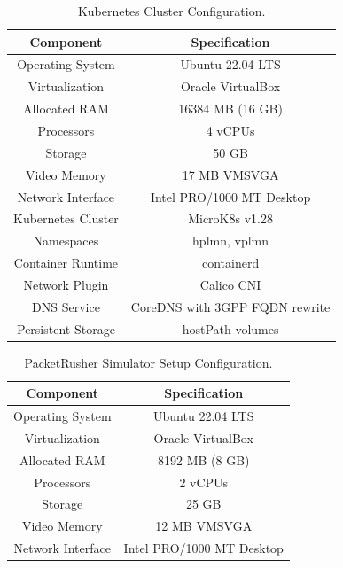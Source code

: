 \documentclass[journal,article,submit,moreauthors,pdftex]{Definitions/tsp}
\begin{document}
\begin{table}[H]
\tablesize{\footnotesize}
\caption{Kubernetes Cluster Configuration.}
\label{tab:kubernetes_config}
\begin{tabularx}{\textwidth}{CC}
\toprule
\textbf{Component}	&\textbf{Specification}	\\
\midrule
Operating System & Ubuntu 22.04 LTS \\
Virtualization & Oracle VirtualBox \\
Allocated RAM & 16384 MB (16 GB) \\
Processors & 4 vCPUs \\
Storage & 50 GB \\
Video Memory & 17 MB VMSVGA \\
Network Interface & Intel PRO/1000 MT Desktop \\
Kubernetes Cluster & MicroK8s v1.28 \\
Namespaces & hplmn, vplmn \\
Container Runtime & containerd \\
Network Plugin & Calico CNI \\
DNS Service & CoreDNS with 3GPP FQDN rewrite \\
Persistent Storage & hostPath volumes \\
\bottomrule
\end{tabularx}
\end{table}

\begin{table}[H]
\tablesize{\footnotesize}
\caption{PacketRusher Simulator Setup Configuration.}
\label{tab:packetrusher_setup}
\begin{tabularx}{\textwidth}{CC}
\toprule
\textbf{Component}	&\textbf{Specification}	\\
\midrule
Operating System & Ubuntu 22.04 LTS \\
Virtualization & Oracle VirtualBox \\
Allocated RAM & 8192 MB (8 GB) \\
Processors & 2 vCPUs \\
Storage & 25 GB \\
Video Memory & 12 MB VMSVGA \\
Network Interface & Intel PRO/1000 MT Desktop  \\
\bottomrule
\end{tabularx}
\end{table}
\end{document}

